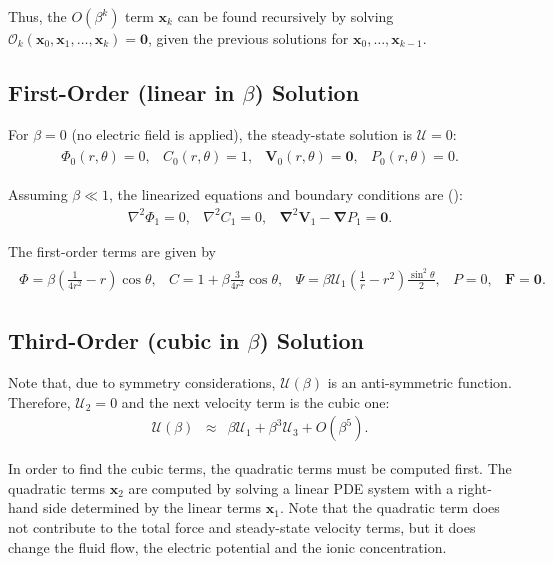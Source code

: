 \documentclass[10pt]{ijnam}
\newcommand{\pars}[1]{\left(#1\right)}
\newcommand\Laplacian{\nabla^2}
\newcommand\bnabla{\boldsymbol{\nabla}}
\newcommand\bLaplacian{\boldsymbol{\nabla}^2}
\newcommand\bV{\boldsymbol{V}}
\newcommand\bF{\boldsymbol{F}}
\newcommand\bx{\boldsymbol{x}}
\newcommand\bzero{\boldsymbol{0}}
\newcommand\cO{\mathcal{O}}
\newcommand\cU{\mathscr{U}}
\begin{document}
Thus, the $O(\beta^k)$ term $\bx_k$ can be found recursively by solving 
$\cO_k(\bx_0, \bx_1, \ldots, \bx_k) = \bzero$,
given the previous solutions for $\bx_0, \ldots, \bx_{k-1}$.

\subsection{First-Order (linear in $\beta$) Solution} \label{app:linear}

For $\beta = 0$ (no electric field is applied), the steady-state solution is $\cU = 0$:
\begin{eqnarray*}\begin{array}{cccc}
\varPhi_0(r,\theta) = 0, &
C_0(r,\theta) = 1, &
\bV_0(r,\theta) = \bzero, &
P_0(r,\theta) = 0.
\end{array}\end{eqnarray*}

Assuming $\beta \ll 1$, the linearized equations and boundary conditions are 
(\cite{yariv2010migration}):
\begin{eqnarray*}
\Laplacian \varPhi_1 = 0, &
\Laplacian C_1 = 0, &
\bLaplacian \bV_1 - \bnabla P_1 = \bzero.
\end{eqnarray*}

The first-order terms are given by
\begin{eqnarray*}
\begin{array}{ccccc}
\varPhi = \beta \pars{\frac{1}{4r^2} - r}\cos\theta, &
C = 1 + \beta \frac{3}{4r^2} \cos\theta, &
\Psi = \beta \cU_1 \pars{\frac{1}{r} - r^2} \frac{\sin^2\theta}{2}, &
P = 0, &
\bF = \bzero.
\end{array}
\end{eqnarray*}

\subsection{Third-Order (cubic in $\beta$) Solution} \label{app:cubic}
Note that, due to symmetry considerations, $\cU(\beta)$ is an anti-symmetric function.
Therefore, $\cU_2 = 0$ and the next velocity term is the cubic one:
\begin{eqnarray*}
\cU(\beta) &\approx& \beta \cU_1 + \beta^3 \cU_3 + O(\beta^5).
\end{eqnarray*}

In order to find the cubic terms, the quadratic terms must be computed first.
The quadratic terms $\bx_2$ are computed by solving a linear PDE system 
with a right-hand side determined by the linear terms $\bx_1$.
Note that the quadratic term does not contribute to the total force and steady-state 
velocity terms, but it does change the fluid flow, 
the electric potential and the ionic concentration.
\end{document}
